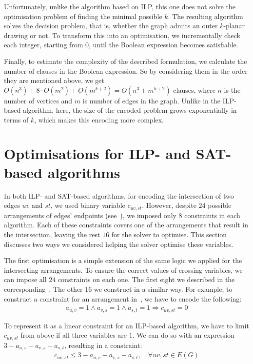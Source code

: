 Unfortunately, unlike the algorithm based on ILP, this one does not solve the optimisation problem of finding the minimal possible \(k\). The resulting algorithm solves the decision problem, that is, whether the graph admits an outer \(k\)-planar drawing or not. To transform this into an optimisation, we incrementally check each integer, starting from \(0\), until the Boolean expression becomes satisfiable.

Finally, to estimate the complexity of the described formulation, we calculate the number of clauses in the Boolean expression. So by considering them in the order they are mentioned above, we get \(O(n^3) + 8 \cdot O(m^2) + O(m^{k+2}) = O(n^3 + m^{k+2})\) clauses, where \(n\) is the number of vertices and \(m\) is number of edges in the graph. Unlike in the ILP-based algorithm, here, the size of the encoded problem grows exponentially in terms of \(k\), which makes this encoding more complex.


\section{Optimisations for ILP- and SAT-based algorithms}\label{sec:optimisations}

In both ILP- and SAT-based algorithms, for encoding the intersection of two edges \(uv\) and \(st\), we used binary variable \(c_{uv, st}\). However, despite \(24\) possible arrangements of edges' endpoints (see~), we imposed only \(8\) constraints in each algorithm. Each of these constraints covers one of the arrangements that result in the intersection, leaving the rest \(16\) for the solver to optimise. This section discusses two ways we considered helping the solver optimise these variables.

The first optimisation is a simple extension of the same logic we applied for the intersecting arrangements. To ensure the correct values of crossing variables, we can impose all \(24\) constraints on each one. The first eight we described in the corresponding~. The other \(16\) we construct in a similar way. For example, to construct a constraint for an arrangement in~, we have to encode the following:
\begin{gather*}
    a_{u,v} = 1 \land a_{v,s} = 1 \land a_{s,t} = 1 \Longrightarrow c_{uv, st} = 0
\end{gather*}

To represent it as a linear constraint for an ILP-based algorithm, we have to limit \(c_{uv, st}\) from above if all three variables are \(1\). We can do so with an expression \(3 - a_{u,v} - a_{v,s} - a_{s,t}\), resulting in a constraint:
\begin{gather*}
    c_{uv, st} \leqslant 3 - a_{u,v} - a_{v,s} - a_{s,t},\quad\forall uv, st \in E(G)
\end{gather*}


